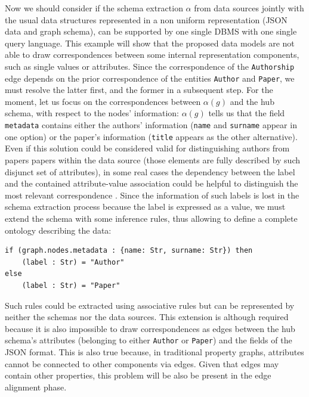 \begin{example}[label=ex:examplegraphdata]
Now we should consider if the schema extraction $\alpha$ from data sources jointly with the usual data structures represented in a non uniform representation (JSON data and graph schema), can be supported by one single DBMS with one single query language. This example will show that the proposed data models are not able to draw correspondences between some internal representation components, such as single values or attributes.  %
Since the correspondence of the \texttt{Authorship} edge depends on the prior correspondence of the entities \texttt{Author} and \texttt{Paper}, we must resolve the latter first, and the former in a subsequent step. For the moment, let us focus on the correspondences between $\alpha(g)$ and the hub schema, with respect to the nodes' information: $\alpha(g)$ tells us that the field \texttt{metadata} contains either the authors' information (\texttt{name} and \texttt{surname} appear in one option) or the paper's information (\texttt{title} appears as the other alternative). Even if this solution could be considered valid for distinguishing authors from papers papers within the data source (those elements are fully described by such disjunct set of attributes), in some real cases the dependency between the label and the contained attribute-value association could be helpful to distinguish the most relevant correspondence \cite{IBMWatson}. Since the information of such labels is lost in the schema extraction process because the label  is expressed as a value,  we must extend the schema with some inference rules, thus allowing to define a complete ontology describing the data:
\begin{lstlisting}[language=theoryjson,basicstyle=\ttfamily\small]
if (graph.nodes.metadata : {name: Str, surname: Str}) then
	(label : Str) = "Author"
else
	(label : Str) = "Paper"
\end{lstlisting}
Such rules could be extracted using associative rules \cite{Tan05} but can be represented by neither the schemas nor the data sources. This extension  is although required because it is also impossible to draw correspondences as edges between the hub schema's attributes (belonging to either \texttt{Author} or \texttt{Paper}) and the fields of the JSON format. This is also true because, in  traditional property graphs, attributes cannot be connected to other components via edges. Given that edges may contain other properties, this problem will be also be present in the edge alignment phase.


\end{example}
